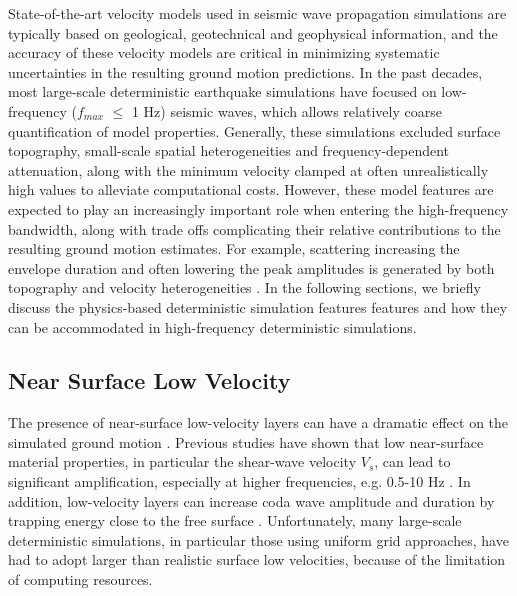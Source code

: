 State-of-the-art velocity models used in seismic wave propagation simulations are typically based on geological, geotechnical and geophysical information, and the accuracy of these velocity models are critical in minimizing systematic uncertainties in the resulting ground motion predictions. In the past decades, most large-scale deterministic earthquake simulations have focused on low-frequency ($f_{max}$ $\leqslant$ 1 Hz) seismic waves, which allows relatively coarse quantification of model properties. Generally, these simulations excluded surface topography, small-scale spatial heterogeneities and frequency-dependent attenuation, along with the minimum velocity clamped at often unrealistically high values to alleviate computational costs. However, these model features are expected to play an increasingly important role when entering the high-frequency bandwidth, along with trade offs complicating their relative contributions to the resulting ground motion estimates. For example, scattering increasing the envelope duration and often lowering the peak amplitudes is generated by both topography and velocity heterogeneities \citet{laiShallowBasinStructure2020}.
In the following sections, we briefly discuss the physics-based deterministic simulation features features and how they can be accommodated in high-frequency deterministic simulations.


\subsection{Near Surface Low Velocity}
The presence of near-surface low-velocity layers can have a dramatic effect on the simulated ground motion .
Previous studies have shown that low near-surface material properties, in particular the shear-wave velocity $V_s$, can lead to significant amplification, especially at higher frequencies, e.g. 0.5-10 Hz \citep{booreSiteAmplificationsGeneric1997,poggiDerivationReferenceShearWave2011}. In addition, low-velocity layers can increase coda wave amplitude and duration by trapping energy close to the free surface \citet{imperatoriBroadbandNearfieldGround2013}. Unfortunately, many large-scale deterministic simulations, in particular those using uniform grid approaches, have had to adopt larger than realistic surface low velocities, because of the limitation of computing resources.

